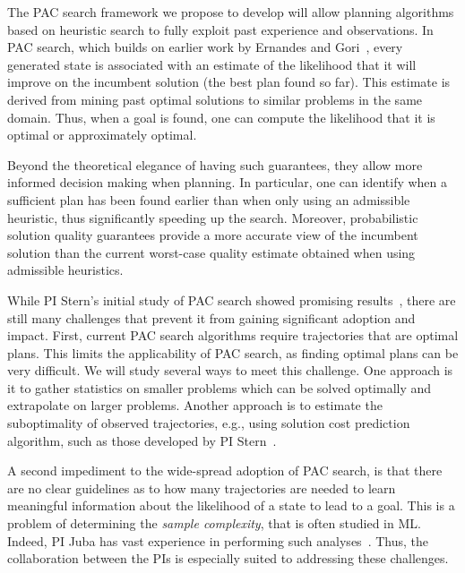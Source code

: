 \documentclass[12pt]{article}
\begin{document}
The PAC search framework we propose to develop will allow planning algorithms based on heuristic search to fully exploit past experience and observations. In PAC search, which builds on earlier work by Ernandes and Gori~\cite{ernandes2004likely}, every generated state is associated with an estimate of the likelihood that it will improve on the incumbent solution (the best plan found so far). This estimate is derived from mining past optimal solutions to similar problems in the same domain. Thus, when a goal is found, one can compute the likelihood that it is optimal or approximately optimal. 


Beyond the theoretical elegance of having such guarantees, they allow more informed decision making when planning. In particular, one can identify when a sufficient plan has been found earlier than when only using an admissible heuristic, thus significantly speeding up the search. Moreover, probabilistic solution quality guarantees provide a more accurate view of the incumbent solution than the current worst-case quality estimate obtained when using admissible heuristics.  



While PI Stern's initial study of PAC search showed promising results~\cite{stern2011probably,stern2012search}, there are still many challenges that prevent it from gaining significant adoption and impact. First, current PAC search algorithms require trajectories that are optimal plans. This limits the applicability of PAC search, as finding optimal plans can be very difficult. We will study several ways to meet this challenge. One approach is it to gather statistics on smaller problems which can be solved optimally and extrapolate on larger problems. Another approach is to estimate the suboptimality of observed trajectories, e.g., using solution cost prediction algorithm, such as those developed by PI Stern~\cite{lelis2016predicting,lelis2011predicting}. 



A second impediment to the wide-spread adoption of PAC search, is that there are no clear guidelines as to how many trajectories are needed to learn meaningful information about the likelihood of a state to lead to a goal. This is a problem of determining the {\em sample complexity}, that is often studied in ML. Indeed, PI Juba has vast experience in performing such analyses~\cite{goldreich2012theory,juba2013ijcai,juba2016jmlr,juba2016aaai}. Thus, the collaboration between the PIs is especially suited to addressing these challenges. 
\end{document}
